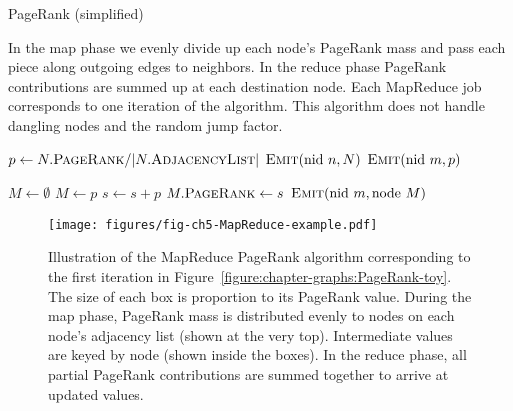 \begin{algorithm}[t]
 \caption{PageRank (simplified)}
\label{algorithm:chapter-graphs:PageRank}
In the map phase we evenly divide up each node's PageRank mass and
pass each piece along outgoing edges to neighbors.  In the reduce
phase PageRank contributions are summed up at each destination node.
Each MapReduce job corresponds to one iteration of the algorithm. This
algorithm does not handle dangling nodes and the random jump factor.

\algrenewcommand{}
\algrenewcommand{}
  \begin{algorithmic}[1]
    \State $p \gets N.\textsc{PageRank} / |N.\textsc{AdjacencyList}|$
    \State $\textsc{Emit}(\textrm{nid }n, N)$
      \State $\textsc{Emit}(\textrm{nid }m, p)$
    \EndFor
    \EndProcedure
    \EndFunction
  \end{algorithmic}

  \begin{algorithmic}[1]
    \State $M \gets \emptyset$
        \State $M \gets p$
      \Else
        \State $s \gets s + p$
      \EndIf
    \EndFor
    \State $M.\textsc{PageRank} \gets s$
    \State $\textsc{Emit}(\textrm{nid }m, \textrm{node }M)$
    \EndProcedure
    \EndFunction
  \end{algorithmic}
\end{algorithm}

\begin{figure}[t]
\begin{center}
\texttt{[image: figures/fig-ch5-MapReduce-example.pdf]}
\end{center}
\caption{Illustration of the MapReduce PageRank algorithm
  corresponding to the first iteration in
  Figure~\ref{figure:chapter-graphs:PageRank-toy}.  The size of each
  box is proportion to its PageRank value.  During the map phase,
  PageRank mass is distributed evenly to nodes on each node's
  adjacency list (shown at the very top).  Intermediate values are
  keyed by node (shown inside the boxes).  In the reduce phase, all
  partial PageRank contributions are summed together to arrive at
  updated values.}
\label{figure:chapter-graphs:PageRank-MapReduce-example}
\end{figure}

